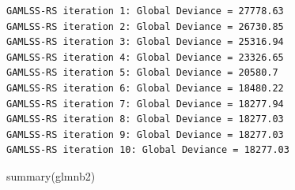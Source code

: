 \documentclass[
  letterpaper,
  DIV=11,
  numbers=noendperiod]{scrreprt}
\newenvironment{Shaded}{\begin{snugshade}}{\end{snugshade}}
\newcommand{\FunctionTok}[1]{\textcolor[rgb]{0.28,0.35,0.67}{#1}}
\newcommand{\NormalTok}[1]{\textcolor[rgb]{0.00,0.23,0.31}{#1}}
\begin{document}
\begin{verbatim}
GAMLSS-RS iteration 1: Global Deviance = 27778.63 
GAMLSS-RS iteration 2: Global Deviance = 26730.85 
GAMLSS-RS iteration 3: Global Deviance = 25316.94 
GAMLSS-RS iteration 4: Global Deviance = 23326.65 
GAMLSS-RS iteration 5: Global Deviance = 20580.7 
GAMLSS-RS iteration 6: Global Deviance = 18480.22 
GAMLSS-RS iteration 7: Global Deviance = 18277.94 
GAMLSS-RS iteration 8: Global Deviance = 18277.03 
GAMLSS-RS iteration 9: Global Deviance = 18277.03 
GAMLSS-RS iteration 10: Global Deviance = 18277.03 
\end{verbatim}

\begin{Shaded}
\begin{Highlighting}[]
\FunctionTok{summary}\NormalTok{(glmnb2)}
\end{Highlighting}
\end{Shaded}
\end{document}
